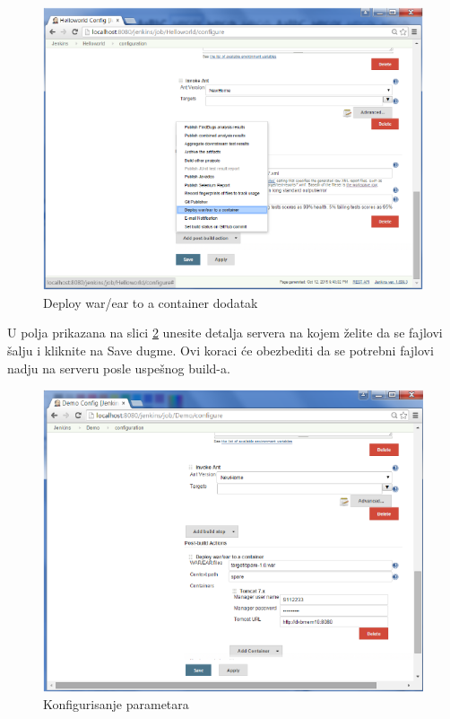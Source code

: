 \begin{figure}
\begin{center}
\includegraphics[scale=0.45]{slike/deploy_war_ear_container.png}
\end{center}
\caption{Deploy war/ear to a container dodatak}
\label{fig:deploy_war_ear_container}
\end{figure}

U polja prikazana na slici \ref{fig:demo_config.png} unesite detalja servera na kojem želite da se fajlovi šalju i kliknite na Save dugme. Ovi koraci će obezbediti da se potrebni fajlovi nadju na serveru posle uspešnog build-a.

\begin{figure}
\begin{center}
\includegraphics[scale=0.45]{slike/demo_config.png}
\end{center}
\caption{Konfigurisanje parametara}
\label{fig:demo_config.png}
\end{figure}


